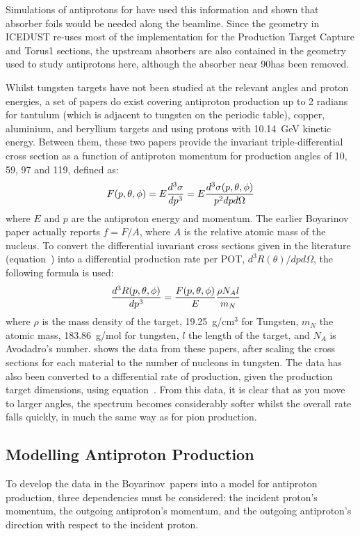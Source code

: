 Simulations of antiprotons for \phaseI have used this information and shown that absorber foils would be needed along the beamline.  
Since the \phaseII geometry in ICEDUST re-uses most of the implementation for the Production Target Capture and Torus1 sections, the upstream absorbers are also contained in the geometry used to study antiprotons here,
although the absorber near 90\degree has been removed.

\FigAntiprotonData
Whilst tungsten targets have not been studied at the relevant angles and proton energies, a set of papers \cite{Boyarinov:1994tp,Kiselev:2012sj} do exist covering antiproton production up to 2 radians for tantulum (which is adjacent to tungsten on the periodic table), copper, aluminium, and beryllium targets and using protons with 10.14~GeV kinetic energy.
Between them, these two papers provide the invariant triple-differential cross section as a function of antiproton momentum for production angles of 10, 59, 97 and 119\degree, defined as:
\begin{equation}
\eqlabel{bg:antiprotons:lit}
	F(p,\theta,\phi)=E \frac{d^3\sigma}{dp^3}=E\frac{d^3\sigma(p,\theta,\phi)}{p^2dpd\Omega}
\end{equation}
where $E$ and $p$ are the antiproton energy and momentum.  The earlier Boyarinov paper actually reports $f=F/A$, where $A$ is the relative atomic mass of the nucleus.
To convert the differential invariant cross sections given in the literature (equation~) into a differential production rate per \ac{POT}, $d^3R(\theta)/dpd\Omega$, the following formula is used:
\begin{align}
	\eqlabel{bg:antiprotons:rate}
	\frac{d^3R(p,\theta,\phi)}{dp^3}&=\frac{F(p,\theta,\phi)}{E}\frac{\rho N_A l}{m_N}
\end{align}
where $\rho$ is the mass density of the target, 19.25~g/cm$^3$ for Tungsten, $m_N$ the atomic mass, 183.86~g/mol for tungsten, $l$ the length of the target, and $N_A$ is Avodadro's number.
 shows the data from these papers, after scaling the cross sections for each material to the number of nucleons in tungsten.
The data has also been converted to a differential rate of production, given the \phaseII production target dimensions, using equation~.
From this data, it is clear that as you move to larger angles, the spectrum becomes considerably softer whilst the overall rate falls quickly, in much the same way as for pion production.

\subsection{Modelling Antiproton Production}
To develop the data in the Boyarinov~\etal papers into a model for antiproton production, three dependencies must be considered:
the incident proton's momentum, the outgoing antiproton's momentum, and the outgoing antiproton's direction with respect to the incident proton.

